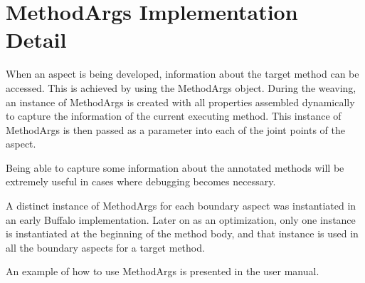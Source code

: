 \section{MethodArgs Implementation Detail}

When an aspect is being developed, information about the target method can be accessed. This is achieved by using the MethodArgs object. During the weaving, an instance of MethodArgs is created with all properties assembled dynamically to capture the information of the current executing method. This instance of MethodArgs is then passed as a parameter into each of the joint points of the aspect.

Being able to capture some information about the annotated methods will be  extremely useful in cases where debugging becomes necessary.

A distinct instance of MethodArgs for each boundary aspect was instantiated in an early Buffalo implementation. Later on as an optimization, only one instance is instantiated at the beginning of the method body, and that instance is used in all the boundary aspects for a target method.

An example of how to use MethodArgs is presented in the user manual.
